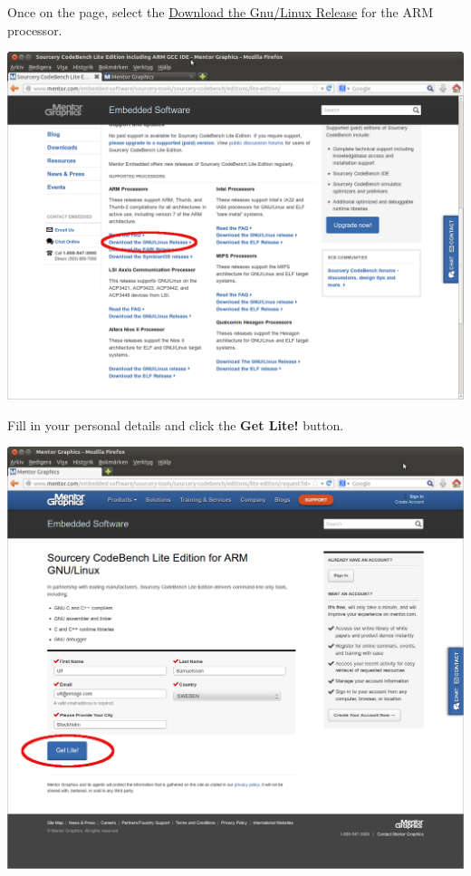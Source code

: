 Once on the page, select the \href{http://www.mentor.com/embedded-software/sourcery-tools/sourcery-codebench/editions/lite-edition/arm-gnu-linux.html}{Download the Gnu/Linux Release} for the ARM processor.
\\

\begin{center}
  \includegraphics[width=\textwidth]{labs/setup-codesourcery/Gnu_Linux.png}
\end{center}
\clearpage

Fill in your personal details and click the {\bf Get Lite!} button.
\\

\begin{center}
  \includegraphics[width=\textwidth]{labs/setup-codesourcery/Mentor_User_Info.png}
\end{center}

